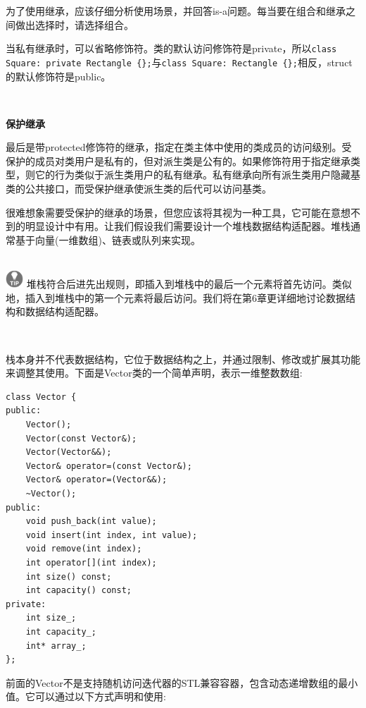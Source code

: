 为了使用继承，应该仔细分析使用场景，并回答is-a问题。每当要在组合和继承之间做出选择时，请选择组合。 \par
当私有继承时，可以省略修饰符。类的默认访问修饰符是private，所以\texttt{class Square: private Rectangle \{\};}与\texttt{class Square: Rectangle \{\};}相反，struct的默认修饰符是public。\par

\noindent\textbf{}\ \par
\textbf{保护继承} \ \par
最后是带protected修饰符的继承，指定在类主体中使用的类成员的访问级别。受保护的成员对类用户是私有的，但对派生类是公有的。如果修饰符用于指定继承类型，则它的行为类似于派生类用户的私有继承。私有继承向所有派生类用户隐藏基类的公共接口，而受保护继承使派生类的后代可以访问基类。 \par
很难想象需要受保护的继承的场景，但您应该将其视为一种工具，它可能在意想不到的明显设计中有用。让我们假设我们需要设计一个堆栈数据结构适配器。堆栈通常基于向量(一维数组)、链表或队列来实现。 \par

\hspace*{\fill} \\ %
\includegraphics[width=0.05\textwidth]{images/tip}
堆栈符合后进先出规则，即插入到堆栈中的最后一个元素将首先访问。类似地，插入到堆栈中的第一个元素将最后访问。我们将在第6章更详细地讨论数据结构和数据结构适配器。 \par
\noindent\textbf{}\ \par

栈本身并不代表数据结构，它位于数据结构之上，并通过限制、修改或扩展其功能来调整其使用。下面是Vector类的一个简单声明，表示一维整数数组:\par

\begin{lstlisting}[caption={}]
class Vector {
public:
	Vector();
	Vector(const Vector&);
	Vector(Vector&&);
	Vector& operator=(const Vector&);
	Vector& operator=(Vector&&);
	~Vector();
public:
	void push_back(int value);
	void insert(int index, int value);
	void remove(int index);
	int operator[](int index);
	int size() const;
	int capacity() const;
private:
	int size_;
	int capacity_;
	int* array_;
};
\end{lstlisting}

前面的Vector不是支持随机访问迭代器的STL兼容容器，包含动态递增数组的最小值。它可以通过以下方式声明和使用:\par


